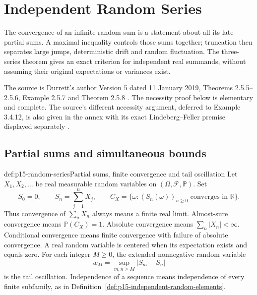 \chapter{Independent Random Series}
\label{sec:p15-independent-random-series}

The convergence of an infinite random sum is a statement about all its
late partial sums. A maximal inequality controls those sums together;
truncation then separates large jumps, deterministic drift and random
fluctuation. The three-series theorem gives an exact criterion for
independent real summands, without assuming their original expectations
or variances exist.

The source is Durrett's author Version 5 dated 11 January 2019,
Theorems 2.5.5--2.5.6, Example 2.5.7 and Theorem 2.5.8
\cite[pp.~84--85]{DurrettPTEAuthor2019}. The necessity proof below is
elementary and complete. The source's different necessity argument,
deferred to Example 3.4.12, is also given in the annex with its exact
Lindeberg--Feller premise displayed separately
\cite[pp.~148--151]{DurrettPTEAuthor2019}.

\section{Partial sums and simultaneous bounds}
\label{sec:p15-series-partial-sums}

\begin{hbdefinition}{def:p15-random-series}{Partial sums, finite convergence and tail oscillation}
Let \(X_1,X_2,\ldots\) be real measurable random variables on
\((\Omega,\mathcal F,\mathbb P)\). Set
\[
 S_0=0,\qquad S_n=\sum_{j=1}^nX_j,\qquad
 C_X=\{\omega:(S_n(\omega))_{n\geq0}
                         \text{ converges in }\mathbb R\}.
\]
Thus convergence of \(\sum_nX_n\) always means a finite real limit.
Almost-sure convergence means \(\mathbb P(C_X)=1\).
Absolute convergence means \(\sum_n|X_n|<\infty\).
Conditional convergence means finite convergence with failure of absolute
convergence. A real random variable is centered when its expectation
exists and equals zero.
For each integer \(M\geq0\), the extended nonnegative random variable
\[
 w_M=\sup_{m,n\geq M}|S_m-S_n|
\]
is the tail oscillation. Independence of a sequence means independence
of every finite subfamily, as in
Definition~\ref{def:p15-independent-random-elements}.
\end{hbdefinition}


